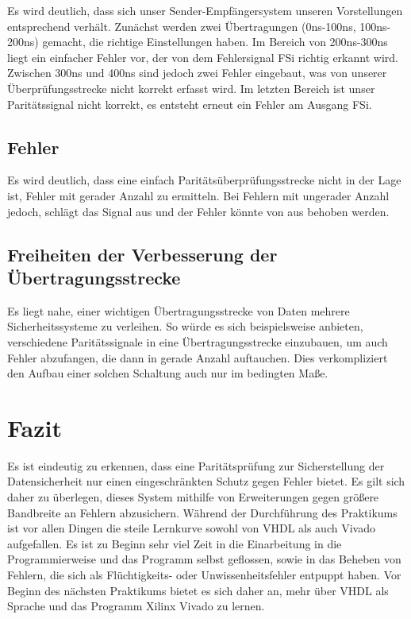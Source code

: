\documentclass{article}
\begin{document}
Es wird deutlich, dass sich unser Sender-Empfängersystem unseren Vorstellungen entsprechend verhält. Zunächst werden zwei Übertragungen (0ns-100ns, 100ns-200ns) gemacht, die richtige Einstellungen haben. Im Bereich von 200ns-300ns liegt ein einfacher Fehler vor, der von dem Fehlersignal FSi richtig erkannt wird. Zwischen 300ns und 400ns sind jedoch zwei Fehler eingebaut, was von unserer Überprüfungsstrecke nicht korrekt erfasst wird. Im letzten Bereich ist unser Paritätssignal nicht korrekt, es entsteht erneut ein Fehler am Ausgang FSi.

\subsection{Fehler}

Es wird deutlich, dass eine einfach Paritätsüberprüfungsstrecke nicht in der Lage ist, Fehler mit gerader Anzahl zu ermitteln. Bei Fehlern mit ungerader Anzahl jedoch, schlägt das Signal aus und der Fehler könnte von aus behoben werden.

\subsection{Freiheiten der Verbesserung der Übertragungsstrecke}

Es liegt nahe, einer wichtigen Übertragungsstrecke von Daten mehrere Sicherheitssysteme zu verleihen. So würde es sich beispielsweise anbieten, verschiedene Paritätssignale in eine Übertragungsstrecke einzubauen, um auch Fehler abzufangen, die dann in gerade Anzahl auftauchen. Dies verkompliziert den Aufbau einer solchen Schaltung auch nur im bedingten Maße.

\section{Fazit}

Es ist eindeutig zu erkennen, dass eine Paritätsprüfung zur Sicherstellung der Datensicherheit nur einen eingeschränkten Schutz gegen Fehler bietet. Es gilt sich daher zu überlegen, dieses System mithilfe von Erweiterungen gegen größere Bandbreite an Fehlern abzusichern.
Während der Durchführung des Praktikums ist vor allen Dingen die steile Lernkurve sowohl von VHDL als auch Vivado aufgefallen. Es ist zu Beginn sehr viel Zeit in die Einarbeitung in die Programmierweise und das Programm selbst geflossen, sowie in das Beheben von Fehlern, die sich als Flüchtigkeits- oder Unwissenheitsfehler entpuppt haben. Vor Beginn des nächsten Praktikums bietet es sich daher an, mehr über VHDL als Sprache und das Programm Xilinx Vivado zu lernen.
\end{document}
